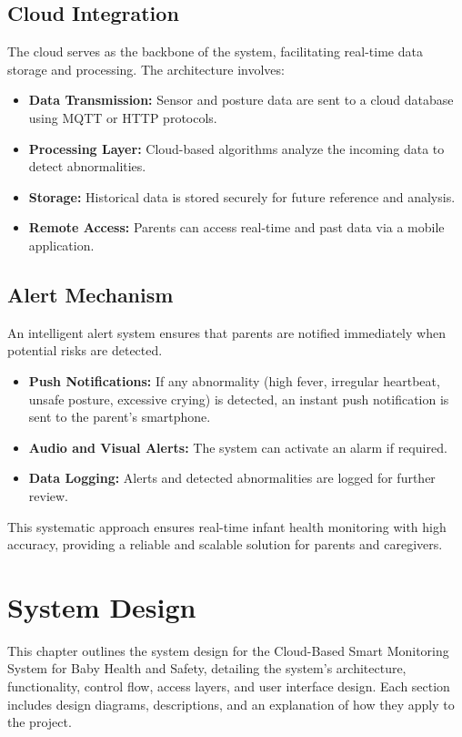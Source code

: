 \documentclass[conference]{IEEEtran}
\begin{document}
\subsection{Cloud Integration}
The cloud serves as the backbone of the system, facilitating real-time data storage and processing. The architecture involves:
\begin{itemize}
    \item \textbf{Data Transmission:} Sensor and posture data are sent to a cloud database using MQTT or HTTP protocols.
    \item \textbf{Processing Layer:} Cloud-based algorithms analyze the incoming data to detect abnormalities.
    \item \textbf{Storage:} Historical data is stored securely for future reference and analysis.
    \item \textbf{Remote Access:} Parents can access real-time and past data via a mobile application.
\end{itemize}

\subsection{Alert Mechanism}
An intelligent alert system ensures that parents are notified immediately when potential risks are detected.
\begin{itemize}
    \item \textbf{Push Notifications:} If any abnormality (high fever, irregular heartbeat, unsafe posture, excessive crying) is detected, an instant push notification is sent to the parent’s smartphone.
    \item \textbf{Audio and Visual Alerts:} The system can activate an alarm if required.
    \item \textbf{Data Logging:} Alerts and detected abnormalities are logged for further review.
\end{itemize}

This systematic approach ensures real-time infant health monitoring with high accuracy, providing a reliable and scalable solution for parents and caregivers.


\section{System Design}
This chapter outlines the system design for the Cloud-Based Smart Monitoring System for Baby Health and Safety, detailing the system's architecture, functionality, control flow, access layers, and user interface design. Each section includes design diagrams, descriptions, and an explanation of how they apply to the project.
\end{document}
